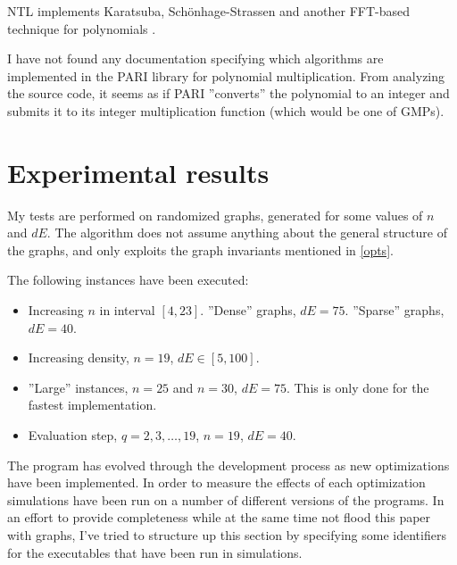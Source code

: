 \documentclass[a4paper]{article}
\begin{document}
NTL implements Karatsuba, Schönhage-Strassen and another FFT-based technique for polynomials \cite{ntl_zzx}.

I have not found any documentation specifying which algorithms are implemented in the PARI library for polynomial multiplication. From analyzing the source code, it seems as if PARI ''converts'' the polynomial to an integer and submits it to its integer multiplication function (which would be one of GMPs).

\section{Experimental results}
My tests are performed on randomized graphs, generated for some values of $n$ and $dE$. The algorithm does not assume anything about the general structure of the graphs, and only exploits the graph invariants mentioned in \ref{opts}.


The following instances have been executed:

\begin{itemize}
 \item Increasing $n$ in interval $[4, 23]$.
 \subitem ''Dense'' graphs, $dE = 75$.
 \subitem ''Sparse'' graphs, $dE = 40$.
 \item Increasing density, $n = 19$, $dE \in [5, 100]$.
 \item ''Large'' instances, $n = 25$ and $n = 30$, $dE = 75$.
 \subitem This is only done for the fastest implementation.
 \item Evaluation step, $q = 2, 3, \ldots, 19$, $n = 19$, $dE = 40$.
\end{itemize}

The program has evolved through the development process as new optimizations have been implemented. In order to measure the effects of each optimization simulations have been run on a number of different versions of the programs. In an effort to provide completeness while at the same time not flood this paper with graphs, I've tried to structure up this section by specifying some identifiers for the executables that have been run in simulations.
\end{document}
